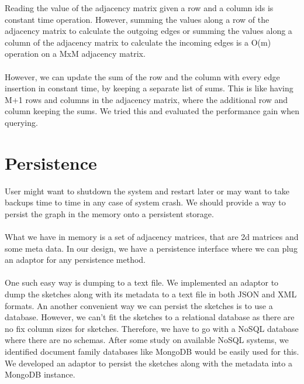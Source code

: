 \documentclass[12pt]{report}
\numberwithin{figure}{section}
\numberwithin{table}{section}
\begin{document}
Reading the value of the adjacency matrix given a row and a column ids is constant time operation. However, summing the values along a row of the adjacency matrix to calculate the outgoing edges or summing the values along a column of the adjacency matrix to calculate the incoming edges is a O(m) operation on a MxM adjacency matrix.

\paragraph{}

However, we can update the sum of the row and the column with every edge insertion in constant time, by keeping a separate list of sums. This is like having M+1 rows and columns in the adjacency matrix, where the additional row and column keeping the sums. We tried this and evaluated the performance gain when querying. 

\section{Persistence}
User might want to shutdown the system and restart later or may want to take backups time to time in any case of system crash. We should provide a way to persist the graph in the memory onto a persistent storage. 

\paragraph{}

What we have in memory is a set of adjacency matrices, that are 2d matrices and some meta data.  In our design, we have a persistence interface where we can plug an adaptor for any persistence method. 

\paragraph{}

One such easy way is dumping to a text file.  We implemented an adaptor to dump the sketches along with its metadata to a text file in both JSON and XML formats. An another convenient way we can persist the sketches is to use a database. However, we can’t fit the sketches to a relational database as there are no fix column sizes for sketches. Therefore, we have to go with a NoSQL database where there are no schemas. After some study on available NoSQL systems, we identified document family databases like MongoDB would be easily used for this. We developed an adaptor to persist the sketches along with the metadata into a MongoDB instance.
\end{document}
